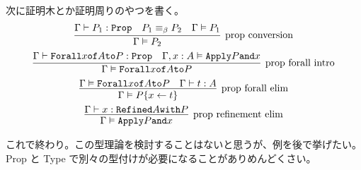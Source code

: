 次に証明木とか証明周りのやつを書く。
\begin{gather*}
  \infer[\text{prop conversion}]{\Gamma \vDash P_2}{\Gamma \vdash P_1 : \texttt{Prop} & P_1 \equiv_{\beta} P_2 & \Gamma \vDash P_1} \\
  \infer[\text{prop forall intro}]{\Gamma \vDash \texttt{Forall} x \texttt{of} A \texttt{to} P}{\Gamma \vdash \texttt{Forall} x \texttt{of} A \texttt{to} P : \texttt{Prop} & \Gamma , x : A \vDash \texttt{Apply} P \texttt{and} x} \\
  \infer[\text{prop forall elim}]{\Gamma \vDash P\{x \leftarrow t\}}{\Gamma \vDash \texttt{Forall} x \texttt{of} A \texttt{to} P & \Gamma \vdash t : A} \\
  \infer[\text{prop refinement elim}]{\Gamma \vDash \texttt{Apply} P \texttt{and} x}{\Gamma \vdash x : \texttt{Refined} A \texttt{with} P}
\end{gather*}

これで終わり。この型理論を検討することはないと思うが、例を後で挙げたい。
Prop と Type で別々の型付けが必要になることがありめんどくさい。